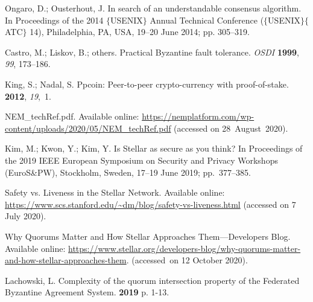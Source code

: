 \documentclass[applsci,article,accept,moreauthors,pdftex]{Definitions/mdpi}
\begin{document}
\begin{thebibliography}{999}
Ongaro, D.; Ousterhout, J.
\newblock In search of an understandable consensus algorithm.
\newblock  In Proceedings of the 2014 $\{$USENIX$\}$ Annual Technical Conference
  ($\{$USENIX$\}$$\{$ATC$\}$ 14),  {Philadelphia, PA, USA,  19--20 June 2014}; pp. 305--319. %

Castro, M.; Liskov, B.; others.
\newblock Practical Byzantine fault tolerance.
\newblock  \emph{OSDI } \textbf{1999}, \emph{99}, 173--186.

King, S.; Nadal, S.
\newblock Ppcoin: Peer-to-peer crypto-currency with proof-of-stake.
 {\bf 2012}, {\em 19},~1.


NEM\_techRef.pdf.  Available online: 
  \url{https://nemplatform.com/wp-content/uploads/2020/05/NEM_techRef.pdf} (accessed on \mbox{28 August 2020}).

Kim, M.; Kwon, Y.; Kim, Y.
\newblock Is Stellar as secure as you think?
\newblock  In Proceedings of the 2019 IEEE European Symposium on Security and Privacy Workshops
  (EuroS\&PW), {Stockholm, Sweden,  17--19 June 2019}; pp.~377--385.%

Safety vs. Liveness in the Stellar Network. Available online:   \url{https://www.scs.stanford.edu/~dm/blog/safety-vs-liveness.html}  (accessed on 7 July 2020).

Why Quorums Matter and How Stellar Approaches Them---Developers Blog. Available online:  
  \url{https://www.stellar.org/developers-blog/why-quorums-matter-and-how-stellar-approaches-them}.
\newblock (accessed~on 12 October 2020).

Lachowski, L.
\newblock Complexity of the quorum intersection property of the Federated
  Byzantine Agreement System.
 {{\bf 2019} p. 1-13}.%


\end{thebibliography}
\end{document}
